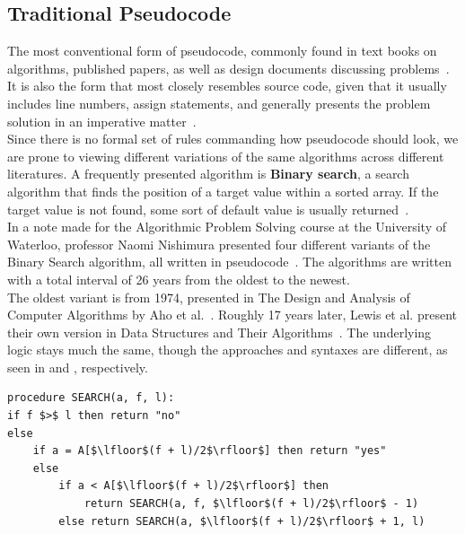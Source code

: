 \subsection{Traditional Pseudocode}

The most conventional form of pseudocode, commonly found in text books on algorithms, published papers, as well as design documents discussing problems~\cite{pseudocodeInBook1, pseudocodeInBook2, pseudocodeInPaper1, pseudocodeInPaper2}. It is also the form that most closely resembles source code, given that it usually includes line numbers, assign statements, and generally presents the problem solution in an imperative matter~\cite[247]{pseudocodeTendsToBeImperative}. \\

Since there is no formal set of rules commanding how pseudocode should look, we are prone to viewing different variations of the same algorithms across different literatures. A frequently presented algorithm is \textbf{Binary search}, a search algorithm that finds the position of a target value within a sorted array. If the target value is not found, some sort of default value is usually returned~\cite{pseudocodeInBook1}. \\

In a note made for the Algorithmic Problem Solving course at the University of Waterloo, professor Naomi Nishimura presented four different variants of the Binary Search algorithm, all written in pseudocode~\cite{differentVersionsOfBinarySearch}. The algorithms are written with a total interval of 26 years from the oldest to the newest. \\

The oldest variant is from 1974, presented in The Design and Analysis of Computer Algorithms by Aho et al.~\cite[139]{binarySearchSource1}. Roughly 17 years later, Lewis et al. present their own version in Data Structures and Their Algorithms~\cite[182]{binarySearchSource2}. The underlying logic stays much the same, though the approaches and syntaxes are different, as seen in  and , respectively. \\

\begin{lstlisting}[caption={Binary Search by Aho et al.}, captionpos=b, label={Binary Search by Aho et al.}]
procedure SEARCH(a, f, l):
if f $>$ l then return "no"
else
    if a = A[$\lfloor$(f + l)/2$\rfloor$] then return "yes"
    else
        if a < A[$\lfloor$(f + l)/2$\rfloor$] then
            return SEARCH(a, f, $\lfloor$(f + l)/2$\rfloor$ - 1)
        else return SEARCH(a, $\lfloor$(f + l)/2$\rfloor$ + 1, l)
\end{lstlisting}

